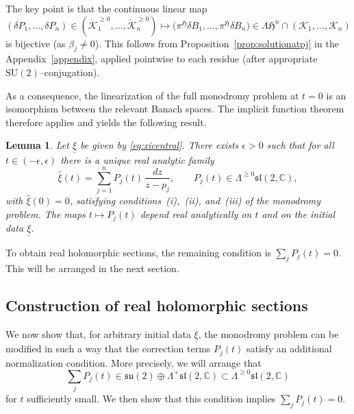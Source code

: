 \documentclass[12pt,a4paper]{amsart}
\newtheorem{lemma}[theorem]{Lemma}
\theoremstyle{definition}
\theoremstyle{remark}
\newcommand{\C}{\mathbb C}
\newcommand{\Res}{\mathrm{Res}}
\begin{document}
The key point is that the continuous linear map
\begin{equation}\label{eq:linIFT}
(\delta P_1,\dots,\delta P_n)\in (\mathring {\mathcal K}^{\geq0}_{1},\dots,\mathring {\mathcal K}^{\geq0}_{n})
\longmapsto
\bigl(\pi^{\mathfrak{H}}\delta B_1,\dots,\pi^{\mathfrak{H}}\delta B_n\bigr)\in \Lambda\mathfrak H^n
\cap(\mathcal K_1,\dots,\mathcal K_n)\end{equation}
is bijective (as $\beta_j\neq0$).
This follows from Proposition~\ref{prop:solutionatpj} in the Appendix~\ref{appendix},
applied pointwise to each residue (after appropriate $\mathrm{SU}(2)$--conjugation).




As a consequence, the linearization of the full monodromy problem at $t=0$ is an
isomorphism between the relevant Banach spaces.
The implicit function theorem therefore applies and yields the following result.
\begin{lemma}\label{lem:monodromy-ift}
Let $\underline\xi$ be given by \eqref{eq:xicentral}.
There exists $\epsilon>0$ such that for all $t\in(-\epsilon,\epsilon)$ there is a
\emph{unique} real analytic family
\[
\hat\xi(t)=\sum_{j=1}^n P_j(t)\,\frac{dz}{z-p_j},
\qquad
P_j(t)\in \Lambda^{\geq0}\mathfrak{sl}(2,\C),
\]
with $\hat\xi(0)=0$, satisfying conditions~\emph{(i)},~\emph{(ii)}, and~\emph{(iii)}
of the monodromy problem.
The maps $t\mapsto P_j(t)$ depend real analytically on $t$ and on the
initial data $\underline\xi$.
\end{lemma}
\noindent

To obtain real holomorphic sections, the remaining condition is $\sum_j P_j(t)=0$. This will be arranged in the next section.



\subsection{Construction of real holomorphic sections}
We now show that, for arbitrary initial data $\underline\xi$, %
the monodromy problem can be modified in such a way
that the correction terms $P_j(t)$ satisfy an additional normalization condition.
More precisely, we will arrange that
\begin{equation}\label{eq:sum-commutator-condition}
\sum_j P_j(t)
\in
\mathfrak{su}(2)\oplus \Lambda^{+}\mathfrak{sl}(2,\C)
\subset
\Lambda^{\geq0}\mathfrak{sl}(2,\C)
\end{equation}
for $t$ sufficiently small. We then show that this condition implies $\sum_j P_j(t)=0.$
\end{document}
